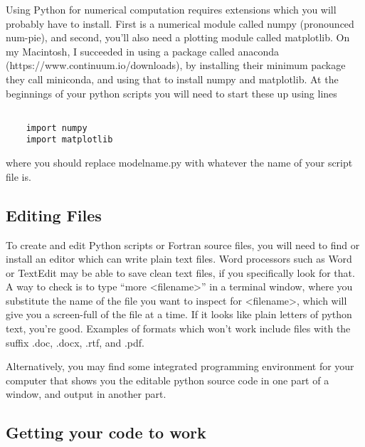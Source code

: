 Using Python for numerical computation requires extensions which you will probably have to install. First is a numerical module called numpy (pronounced num-pie), and second, you'll also need a plotting module called matplotlib. On my Macintosh, I succeeded in using a package called anaconda (https://www.continuum.io/downloads), by installing their minimum package they call miniconda, and using that to install numpy and matplotlib. At the beginnings of your python scripts you will need to start these up using lines

\begin{code}[]
	\begin{lstlisting}
	
	import numpy
	import matplotlib
	\end{lstlisting}
\end{code}

where you should replace modelname.py with whatever the name of your script file is.

\subsection{Editing Files}

To create and edit Python scripts or Fortran source files, you will need to find or install an editor which can write plain text files. Word processors such as Word or TextEdit may be able to save clean text files, if you specifically look for that. A way to check is to type “more <filename>” in a terminal window, where you substitute the name of the file you want to inspect for <filename>, which will give you a screen-full of the file at a time. If it looks like plain letters of python text, you’re good. Examples of formats which won’t work include files with the suffix .doc, .docx, .rtf, and .pdf.

Alternatively, you may find some integrated programming environment for your computer that shows you the editable python source code in one part of a window, and output in another part.

\subsection{Getting your code to work}

